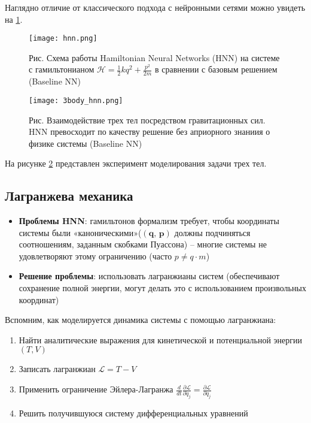 Наглядно отличие от классического подхода с нейронными сетями можно увидеть на \ref{hnn}.

\begin{figure}[h]
	\centering
	\texttt{[image: hnn.png]}
	\label{hnn}
	\caption{Рис.  Схема работы Hamiltonian Neural Networks (HNN) на системе с гамильтонианом $
		\mathcal{H}=\frac{1}{2} k q^{2}+\frac{p^{2}}{2 m} $ в сравнении с базовым решением (Baseline NN)}
\end{figure}

\begin{figure}[h]
	\centering
	\texttt{[image: 3body\_hnn.png]}
	\label{3body_hnn}
	\caption{Рис. Взаимодействие трех тел посредством гравитационных сил. HNN превосходит по качеству решение без априорного знаниия о физике системы (Baseline NN)}
\end{figure}

На рисунке \ref{3body_hnn} представлен эксперимент моделирования задачи трех тел.

\subsection{Лагранжева механика}
\begin{itemize}
	\item \textbf{Проблемы HNN}: гамильтонов формализм требует, чтобы координаты системы были «каноническими»($(\textbf{q, p})$ должны подчиняться соотношениям, заданным скобками Пуассона) -- многие системы не удовлетворяют этому ограничению (часто $p \neq q \cdot m$)
	\item \textbf{Решение проблемы}: использовать лагранжианы систем (обеспечивают сохранение полной энергии, могут делать это с использованием произвольных координат)
\end{itemize}

Вспомним, как моделируется динамика системы с помощью лагранжиана:
\begin{enumerate}
	\item Найти аналитические выражения для кинетической и потенциальной энергии $(T, V )$
	\item Записать лагранжиан $\mathcal{L} = T - V $
	\item Применить ограничение Эйлера-Лагранжа $\frac{d}{d t} \frac{\partial \mathcal{L}}{\partial \dot{q}_{j}} =\frac{\partial \mathcal{L}}{\partial q_{j}} $
	\item Решить получившуюся систему дифференциальных уравнений
\end{enumerate}

